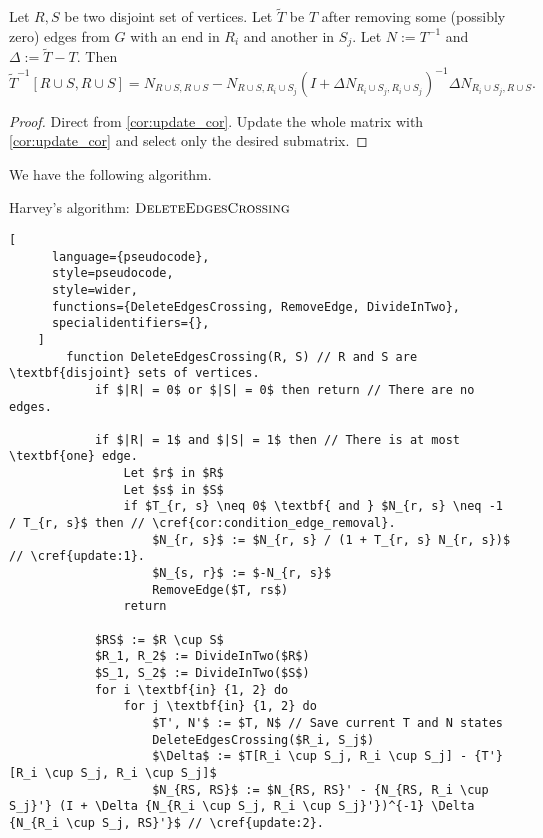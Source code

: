 \begin{theorem}[Update 2]
\label{update:2}
    Let \(R, S\) be two disjoint set of vertices. Let \(\tilde{T}\) be \(T\) after removing some (possibly zero) edges from \(G\) with an end in \(R_i\) and another in \(S_j\).
    Let \(N := T^{-1}\) and \(\Delta := \tilde{T} - T\). Then
    \[
      {\tilde{T}}^{-1}[R \cup S, R \cup S] = N_{R \cup S, R \cup S} - N_{R \cup S, R_i \cup S_j}(I + \Delta N_{R_i \cup S_j, R_i \cup S_j})^{-1} \Delta N_{R_i \cup S_j, R \cup S}.
    \]
\end{theorem}

\begin{proof}
    Direct from \cref{cor:update_cor}. Update the whole matrix with \ref{cor:update_cor} and select only the desired submatrix.
\end{proof}

We have the following algorithm.

\newpage
\begin{programruledcaption}{Harvey's algorithm: \(\textsc{DeleteEdgesCrossing}\)}
    \begin{lstlisting}[
      language={pseudocode},
      style=pseudocode,
      style=wider,
      functions={DeleteEdgesCrossing, RemoveEdge, DivideInTwo},
      specialidentifiers={},
    ]
        function DeleteEdgesCrossing(R, S) // R and S are \textbf{disjoint} sets of vertices.
            if $|R| = 0$ or $|S| = 0$ then return // There are no edges.

            if $|R| = 1$ and $|S| = 1$ then // There is at most \textbf{one} edge.
                Let $r$ in $R$
                Let $s$ in $S$
                if $T_{r, s} \neq 0$ \textbf{ and } $N_{r, s} \neq -1 / T_{r, s}$ then // \cref{cor:condition_edge_removal}.
                    $N_{r, s}$ := $N_{r, s} / (1 + T_{r, s} N_{r, s})$ // \cref{update:1}.
                    $N_{s, r}$ := $-N_{r, s}$
                    RemoveEdge($T, rs$)
                return

            $RS$ := $R \cup S$
            $R_1, R_2$ := DivideInTwo($R$)
            $S_1, S_2$ := DivideInTwo($S$)
            for i \textbf{in} {1, 2} do
                for j \textbf{in} {1, 2} do
                    $T', N'$ := $T, N$ // Save current T and N states
                    DeleteEdgesCrossing($R_i, S_j$)
                    $\Delta$ := $T[R_i \cup S_j, R_i \cup S_j] - {T'}[R_i \cup S_j, R_i \cup S_j]$
                    $N_{RS, RS}$ := $N_{RS, RS}' - {N_{RS, R_i \cup S_j}'} (I + \Delta {N_{R_i \cup S_j, R_i \cup S_j}'})^{-1} \Delta {N_{R_i \cup S_j, RS}'}$ // \cref{update:2}.
    \end{lstlisting}
\end{programruledcaption}

